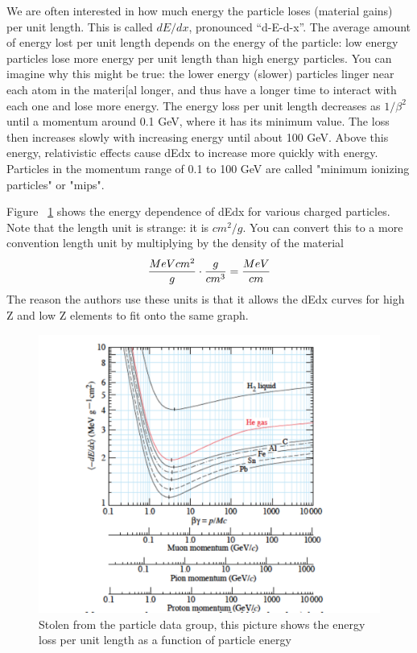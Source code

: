 We are often interested in how much energy the particle loses (material gains) per unit length.  This is called $dE/dx$, pronounced ``d-E-d-x''.    The average amount of energy lost per unit length depends on the energy of the particle: low energy particles lose more energy per unit length than high energy particles.  You can imagine why this might be true: the lower energy (slower) particles linger near each atom in the materi[al longer, and thus have a longer time to interact with each one and lose more energy.  The energy loss per unit length decreases as $1/\beta^2$ until a momentum around 0.1 GeV, where it has its minimum value.  The loss then increases slowly with increasing energy until about 100 GeV.  Above this energy, relativistic effects cause dEdx to increase more quickly with energy.  Particles in the momentum range of 0.1 to 100 GeV are called "minimum ionizing particles" or "mips".

Figure ~\ref{fig:pdgdedx} shows the energy dependence of dEdx for various charged particles.  Note that the length unit is strange: it is $cm^2/g$.  You can convert this to a more convention length unit by multiplying by the density of the material
\begin{equation}
{{MeV cm^2}\over{g}} \cdot {{g}\over{cm^3}} = {{MeV}\over{cm}}
\end{equation}
The reason the authors use these units is that it allows the dEdx curves for high Z and low Z elements to fit onto the same graph.

\begin{figure}[h]
\centering\includegraphics[scale=0.5]{./particleinteractions/Pictures/dedx.pdf}
\caption{Stolen from the particle data group, this picture shows the energy
loss per unit length as a function of particle energy}
\label{fig:pdgdedx}
\end{figure}

